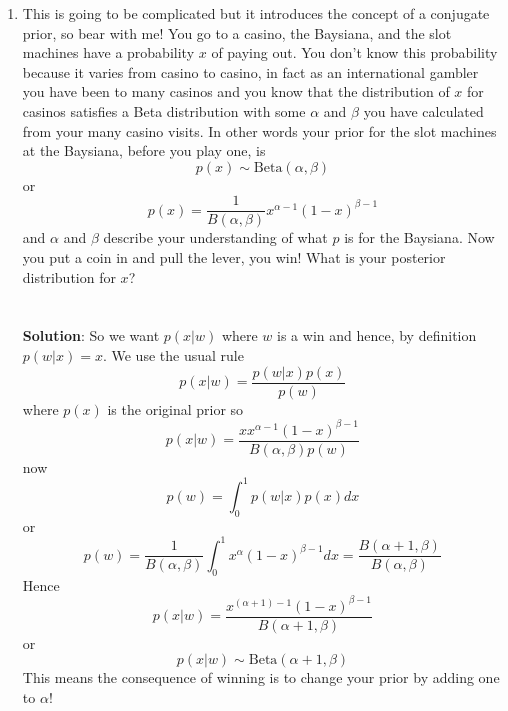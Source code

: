 \documentclass[11pt,a4paper]{scrartcl}
\begin{document}
\begin{enumerate}
 
\item This is going to be complicated but it introduces the concept of
  a conjugate prior, so bear with me! You go to a casino, the
  Baysiana, and the slot machines have a probability $x$ of paying
  out. You don't know this probability because it varies from casino
  to casino, in fact as an international gambler you have been to many
  casinos and you know that the distribution of $x$ for casinos
  satisfies a Beta distribution with some $\alpha$ and $\beta$ you
  have calculated from your many casino visits. In other words your
  prior for the slot machines at the Baysiana, before you play one, is
  \begin{equation}
    p(x)\sim \mbox{Beta}(\alpha,\beta)
  \end{equation}
  or
  \begin{equation}
    p(x)=\frac{1}{B(\alpha,\beta)}x^{\alpha-1}(1-x)^{\beta-1}
  \end{equation}
  and $\alpha$ and $\beta$ describe your understanding of what $p$ is
  for the Baysiana. Now you put a coin in and pull the lever, you win!
  What is your posterior distribution for $x$?
  \\ \\ \\ \textbf{Solution}:
  So we want $p(x|w)$ where $w$ is a win and hence, by definition $p(w|x)=x$. We use the usual rule
  \begin{equation}
    p(x|w)=\frac{p(w|x)p(x)}{p(w)}
  \end{equation}
  where $p(x)$ is the original prior so
  \begin{equation}
    p(x|w)=\frac{x x^{\alpha-1}(1-x)^{\beta-1}}{B(\alpha,\beta)p(w)}
  \end{equation}
  now
  \begin{equation}
    p(w) = \int_0^1 p(w|x)p(x)dx
  \end{equation}
  or
  \begin{equation}
    p(w)=\frac{1}{B(\alpha,\beta)}\int_0^1 x^{\alpha}(1-x)^{\beta-1}dx=\frac{B(\alpha+1,\beta)}{B(\alpha,\beta)}
  \end{equation}
  Hence
  \begin{equation}
    p(x|w)=\frac{x^{(\alpha+1)-1}(1-x)^{\beta-1}}{B(\alpha+1,\beta)}
  \end{equation}
  or
  \begin{equation}
    p(x|w)\sim \mbox{Beta}(\alpha+1,\beta)
  \end{equation}
This means the consequence of winning is to change your prior by adding one to $\alpha$! 

  
  

  
\end{enumerate}
\end{document}
